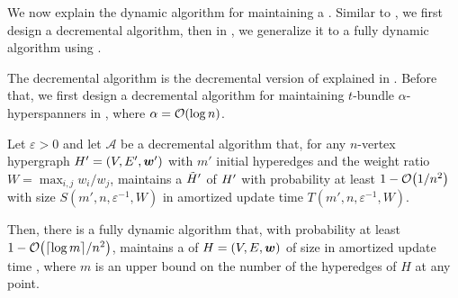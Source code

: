 We now explain the dynamic algorithm for maintaining a \SpectralHypersparsifier{}.
Similar to \cite{Abraham:2016aa}, we first design a decremental algorithm, then in , we generalize it to a fully dynamic algorithm using .

The decremental algorithm is the decremental version of  explained in .
Before that, we first design a decremental algorithm for maintaining \( t \)-bundle \( \alpha \)-hyperspanners in , where \( \alpha = \atmost{\log n} \).




\begin{lemma} \label{lem:turn_to_fully_dynamic}
Let \( \varepsilon > 0 \) and let
\( \mathcal A \) be a decremental algorithm that, for any \( n \)-vertex hypergraph \( { H'} = (V, E', \boldsymbol{w}') \) with \( m' \) initial hyperedges  and the weight ratio \( W = \max _{i,j} w_i / w_j \), maintains a \SpectralHypersparsifier{} \( { \tilde H'} \) of \( { H'} \) with probability at least \( 1 - \atmost{1 / n^{2}} \) with size \( S(m', n, \varepsilon ^{-1}, W) \) in amortized update time \( T(m', n, \varepsilon ^{-1}, W) \).



Then, there is a fully dynamic algorithm that, with probability at least \( 1 - \atmost{ \lceil \log m \rceil /n^{2}} \), maintains a \SpectralHypersparsifier{} of \( { H} = (V, E, \boldsymbol{w}) \) of size  in amortized update time , where \( m \) is an upper bound on the number of the hyperedges of \( H \) at any point.
\end{lemma}
